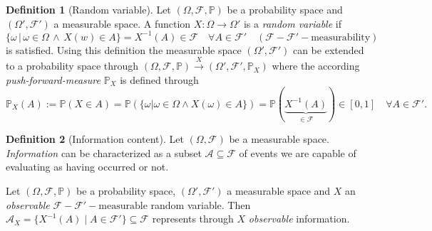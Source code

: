 \documentclass[
]{report}
\theoremstyle{definition}
\newtheorem{definition}{Definition}[section]
\begin{document}
\begin{definition}[Random variable]
Let $(\Omega, \mathcal{F}, \mathbb{P})$ be a probability space and $(\Omega', \mathcal{F}')$ a measurable space. A function $X: \Omega \rightarrow \Omega'$ is a \textit{random variable} if 
$$ \{\omega \, | \,  \omega \in \Omega \, \land \, X(w) \in A \} = X^{-1} (A) \in \mathcal{F} \quad \forall A \in \mathcal{F}' \quad (\mathcal{F}-\mathcal{F}'-\text{measurability})$$
is satisfied. Using this definition the measurable space $(\Omega', \mathcal{F}')$ can be extended to a probability space through \mbox{$(\Omega, \mathcal{F}, \mathbb{P}) \xrightarrow{X} (\Omega', \mathcal{F}', \mathbb{P}_X)$} where the according \textit{push-forward-measure} $\mathbb{P}_X$ is defined through 
$$\mathbb{P}_X (A) := \mathbb{P}(X \in A) \overset{}{=} \mathbb{P} (\{\omega | \omega \in \Omega \land X(\omega) \in A \}) \overset{\text{}}{=} \mathbb{P}( \underbrace{X^{-1} (A)}_{\in \mathcal{F}}) \in [0,1] \quad \forall A \in \mathcal{F}'.$$
\end{definition}

\begin{definition}[Information content]
Let $(\Omega, \mathcal{F})$ be a measurable space. \textit{Information} can be characterized as a subset $\mathcal{A} \subseteq \mathcal{F}$ of events we are capable of evaluating as having occurred or not.


Let $(\Omega, \mathcal{F}, \mathbb{P})$ be a probability space, $(\Omega', \mathcal{F}')$ a measurable space and $X$ an \textit{observable} $\mathcal{F}-\mathcal{F}'-\text{measurable}$ random variable. Then $\mathcal{A}_X = \{X^{-1}({A}) \mid {A} \in {\mathcal{F}'}\} \subseteq \mathcal{F}$ represents through $X$ \textit{observable} information.
\end{definition}
\end{document}
